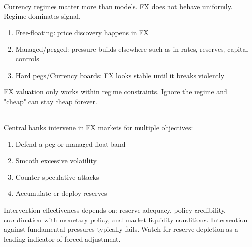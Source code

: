 \begin{remark} \\
Currency regimes matter more than models. FX does not behave uniformly. Regime dominates signal.
\begin{enumerate}[label=\roman*.]
\setlength{\itemsep}{0pt}
\item Free-floating: price discovery happens in FX
\item Managed/pegged: pressure builds elsewhere such as in rates, reserves, capital controls
\item Hard pegs/Currency boards: FX looks stable until it breaks violently
\end{enumerate}
FX valuation only works within regime constraints. Ignore the regime and "cheap" can stay cheap forever.
\end{remark}

\begin{remark} \\
Central banks intervene in FX markets for multiple objectives:
\begin{enumerate}[label=\roman*.]
\setlength{\itemsep}{0pt}
\item Defend a peg or managed float band
\item Smooth excessive volatility
\item Counter speculative attacks
\item Accumulate or deploy reserves
\end{enumerate}
Intervention effectiveness depends on: reserve adequacy, policy credibility, coordination with monetary policy, and market liquidity conditions. Intervention against fundamental pressures typically fails. Watch for reserve depletion as a leading indicator of forced adjustment.
\end{remark}

